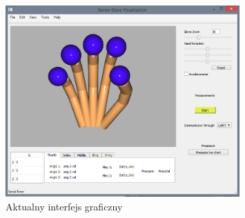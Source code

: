 \documentclass[12pt,a4paper]{article}
\begin{document}
\begin{figure}[htb!]
\centering
\includegraphics[width=0.8\textwidth]{images/aktualnyinterfejsgraficzny.png}
\caption{Aktualny interfejs graficzny}
\label{fig:wds}
\end{figure}
\end{document}
